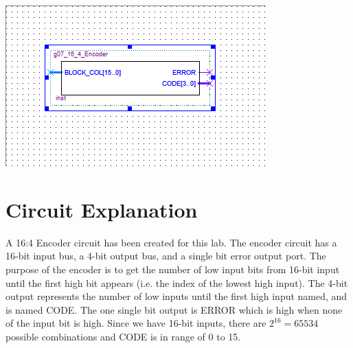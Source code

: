 \documentclass[Report1]{subfiles}
\begin{document}
\centerline{\includegraphics{encoder_schematic}}
\section{Circuit Explanation}
A 16:4 Encoder circuit has been created for this lab. The encoder circuit has a 16-bit input bus, a 4-bit output bus, and a single bit error output port. The purpose of the encoder is to get the number of low input bits from 16-bit input until the first high bit appears (i.e. the index of the lowest high input). The 4-bit output represents the number of low inputs until the first high input named, and is named CODE. The one single bit output is ERROR which is high when none of the input bit is high. Since we have 16-bit inputs, there are $2^{16}=65534$ possible combinations and CODE is in range of 0 to 15.
\end{document}

